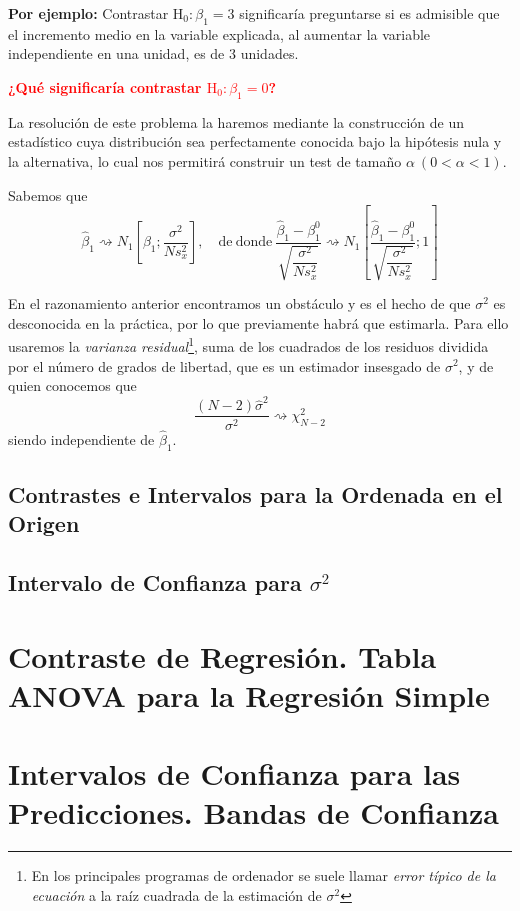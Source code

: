 \documentclass[10pt,a4paper]{book}
\begin{document}
\textbf{Por ejemplo:} Contrastar $\mathrm{H_0}:\beta_1=3$ significaría preguntarse si es admisible que el incremento medio en la variable explicada, al aumentar la variable independiente en una unidad, es de 3 unidades.

\textbf{\textcolor{red}{¿Qué significaría contrastar $\mathrm{H_0}:\beta_1=0$?}}

La resolución de este problema la haremos mediante la construcción de un estadístico cuya distribución sea perfectamente conocida bajo la hipótesis nula y la alternativa, lo cual nos permitirá construir un test de tamaño $\alpha\ (0<\alpha <1)$.

Sabemos que $$\widehat{\beta}_1\rightsquigarrow N_1 \left[\beta_1;\dfrac{\sigma^2}{Ns^2_x}\right],\quad \mathrm{de\ donde\ }\frac{\widehat{\beta}_1-\beta^0_1}{\sqrt{\dfrac{\sigma^2}{Ns^2_x}}}\rightsquigarrow N_1\left[\frac{\widehat{\beta}_1-\beta^0_1}{\sqrt{\dfrac{\sigma^2}{Ns^2_x}}};1\right]$$

En el razonamiento anterior encontramos un obstáculo y es el hecho de que $\sigma^2$ es desconocida en la práctica, por lo que previamente habrá que estimarla. Para ello usaremos la \textit{varianza residual}\footnote{ En los principales programas de ordenador se suele llamar \textit{error típico de la ecuación} a la raíz cuadrada de la estimación de $\sigma^2$}, suma de los cuadrados de los residuos dividida por el número de grados de libertad, que es un estimador insesgado de $\sigma^2$, y de quien conocemos que $$\dfrac{(N-2)\widehat{\sigma}^2}{\sigma^2}\rightsquigarrow \chi^2_{N-2}$$ siendo independiente de $\widehat{\beta}_1$.
		\subsection{Contrastes e Intervalos para la Ordenada en el Origen}
		
		\subsection{Intervalo de Confianza para $\sigma^2$}
		
	\section{Contraste de Regresión. Tabla ANOVA para la Regresión Simple}
	\section{Intervalos de Confianza para las Predicciones. Bandas de Confianza}
\end{document}
